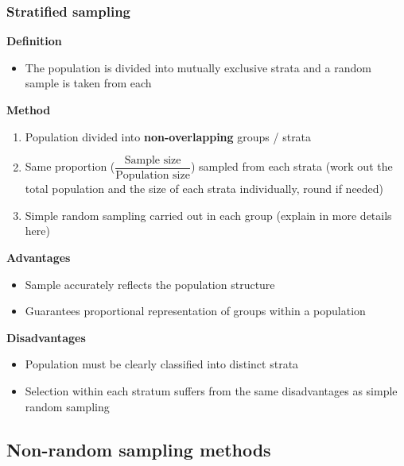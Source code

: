 \documentclass[A4paper, 11pt]{article}
\begin{document}
	\subsubsection{Stratified sampling}
	\textbf{Definition}
	\begin{itemize}
		\item The population is divided into mutually exclusive strata and a random sample is taken from each
	\end{itemize}
	\textbf{Method}
	\begin{enumerate}
		\item Population divided into \textbf{non-overlapping} groups / strata
		\item Same proportion ($\dfrac{\text{Sample size}}{\text{Population size}}$) sampled from each strata (work out the total population and the size of each strata individually, round if needed)
		\item Simple random sampling carried out in each group (explain in more details here)
	\end{enumerate}
	\textbf{Advantages}
	\begin{itemize}
		\item Sample accurately reflects the population structure
		\item Guarantees proportional representation of groups within a population
	\end{itemize}
	\textbf{Disadvantages}
	\begin{itemize}
		\item Population must be clearly classified into distinct strata
		\item Selection within each stratum suffers from the same disadvantages as simple random sampling
	\end{itemize}
	\subsection{Non-random sampling methods}
\end{document}
